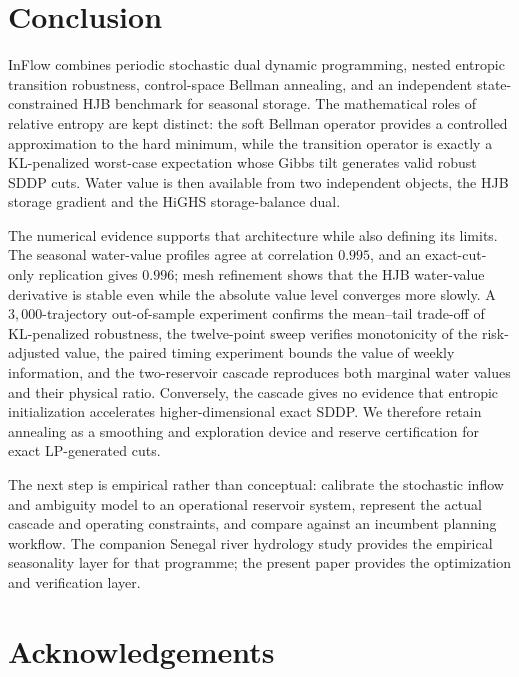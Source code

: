 \documentclass[pdflatex,sn-mathphys-num]{sn-jnl}
\theoremstyle{thmstyleone}
\theoremstyle{thmstyletwo}
\theoremstyle{thmstylethree}
\begin{document}
\section{Conclusion}
\label{sec:conclusion}

InFlow combines periodic stochastic dual dynamic programming, nested entropic
transition robustness, control-space Bellman annealing, and an independent
state-constrained HJB benchmark for seasonal storage. The mathematical roles
of relative entropy are kept distinct: the soft Bellman operator provides a
controlled approximation to the hard minimum, while the transition operator
is exactly a KL-penalized worst-case expectation whose Gibbs tilt generates
valid robust SDDP cuts. Water value is then available from two independent
objects, the HJB storage gradient and the HiGHS storage-balance dual.

The numerical evidence supports that architecture while also defining its
limits. The seasonal water-value profiles agree at correlation $0.995$, and an
exact-cut-only replication gives $0.996$; mesh refinement shows that the HJB
water-value derivative is stable even while the absolute value level converges
more slowly. A $3{,}000$-trajectory out-of-sample experiment confirms the
mean--tail trade-off of KL-penalized robustness, the twelve-point sweep verifies
monotonicity of the risk-adjusted value, the paired timing experiment bounds
the value of weekly information, and the two-reservoir cascade reproduces both
marginal water values and their physical ratio. Conversely, the cascade gives
no evidence that entropic initialization accelerates higher-dimensional exact
SDDP. We therefore retain annealing as a smoothing and exploration device and
reserve certification for exact LP-generated cuts.

The next step is empirical rather than conceptual: calibrate the stochastic
inflow and ambiguity model to an operational reservoir system, represent the
actual cascade and operating constraints, and compare against an incumbent
planning workflow. The companion Senegal river hydrology study
\citep{affognon2026wavelet} provides the empirical seasonality layer for that
programme; the present paper provides the optimization and verification layer.

\backmatter

\section*{Acknowledgements}
\end{document}
